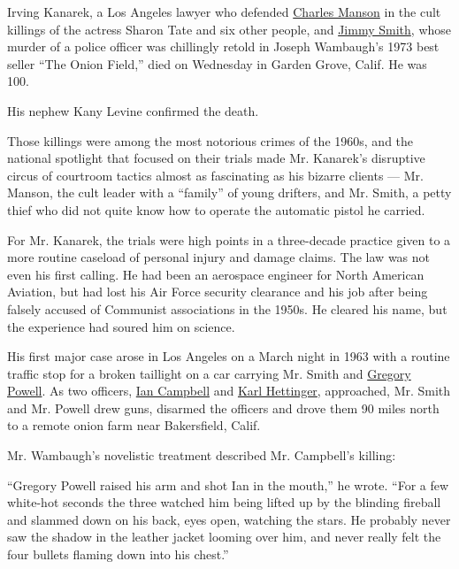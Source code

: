 Irving Kanarek, a Los Angeles lawyer who defended
\href{https://www.nytimes3xbfgragh.onion/2017/11/20/obituaries/charles-manson-dead.html}{Charles
Manson} in the cult killings of the actress Sharon Tate and six other
people, and
\href{https://www.nytimes3xbfgragh.onion/2007/04/10/obituaries/10smith.html}{Jimmy
Smith}, whose murder of a police officer was chillingly retold in Joseph
Wambaugh's 1973 best seller ``The Onion Field,'' died on Wednesday in
Garden Grove, Calif. He was 100.

His nephew Kany Levine confirmed the death.

Those killings were among the most notorious crimes of the 1960s, and
the national spotlight that focused on their trials made Mr. Kanarek's
disruptive circus of courtroom tactics almost as fascinating as his
bizarre clients --- Mr. Manson, the cult leader with a ``family'' of
young drifters, and Mr. Smith, a petty thief who did not quite know how
to operate the automatic pistol he carried.

For Mr. Kanarek, the trials were high points in a three-decade practice
given to a more routine caseload of personal injury and damage claims.
The law was not even his first calling. He had been an aerospace
engineer for North American Aviation, but had lost his Air Force
security clearance and his job after being falsely accused of Communist
associations in the 1950s. He cleared his name, but the experience had
soured him on science.

His first major case arose in Los Angeles on a March night in 1963 with
a routine traffic stop for a broken taillight on a car carrying Mr.
Smith and
\href{https://www.nytimes3xbfgragh.onion/2012/08/14/us/gregory-powell-the-onion-field-killer-dies-at-79.html}{Gregory
Powell}. As two officers,
\href{https://latimesblogs.latimes.com/lanow/2013/03/onion-field-police-officer-honored-with-hollywood-sign.html}{Ian
Campbell} and
\href{https://www.nytimes3xbfgragh.onion/1994/05/06/obituaries/karl-hettinger-onion-field-officer-59.html}{Karl
Hettinger}, approached, Mr. Smith and Mr. Powell drew guns, disarmed the
officers and drove them 90 miles north to a remote onion farm near
Bakersfield, Calif.

Mr. Wambaugh's novelistic treatment described Mr. Campbell's killing:

``Gregory Powell raised his arm and shot Ian in the mouth,'' he wrote.
``For a few white-hot seconds the three watched him being lifted up by
the blinding fireball and slammed down on his back, eyes open, watching
the stars. He probably never saw the shadow in the leather jacket
looming over him, and never really felt the four bullets flaming down
into his chest.''

